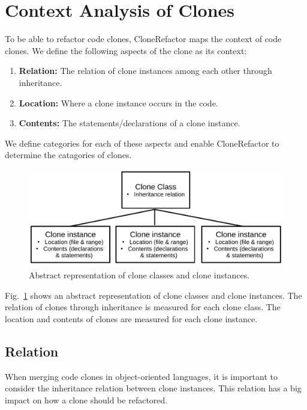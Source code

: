 \section{Context Analysis of Clones}\label{chap:contextsetup}
To be able to refactor code clones, CloneRefactor maps the context of code clones. We define the following aspects of the clone as its context:
\begin{enumerate}
  \item \textbf{Relation:} The relation of clone instances among each other through inheritance.
  \item \textbf{Location:} Where a clone instance occurs in the code.
  \item \textbf{Contents:} The statements/declarations of a clone instance.
\end{enumerate}
We define categories for each of these aspects and enable CloneRefactor to determine the catagories of clones.

\begin{figure}[H]
  \centering
    \includegraphics[width=0.8\columnwidth]{img/context}
    \caption{Abstract representation of clone classes and clone instances.}
  \label{fig:clonecontext}
\end{figure}

Fig.~\ref{fig:clonecontext} shows an abstract representation of clone classes and clone instances. The relation of clones through inheritance is measured for each clone class. The location and contents of clones are measured for each clone instance.

\subsection{Relation}\label{sec:setuprelation}
When merging code clones in object-oriented languages, it is important to consider the inheritance relation between clone instances. This relation has a big impact on how a clone should be refactored.

